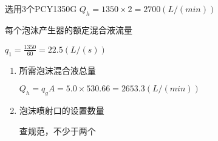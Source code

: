 \documentclass[fontset=windows]{article}
\newcommand{\upcite}[1]{\textsuperscript{\cite{#1}}}
\begin{document}
{选用3个PCY1350G  $Q_h = 1350 \times  2 = 2700 (  L / ( min) ) $}\par
每个泡沫产生器的额定混合液流量

{ $q_1 = \frac{1350}
    {60}
    =22.5 (  L / ( s) ) $}
    \begin{enumerate} %
        \item 所需泡沫混合液总量\par
        { $Q_h = q_gA = 5.0 \times 530.66 = 2653.3 (  L / ( min) ) $}\par
        \item 泡沫喷射口的设置数量\par
        查规范，不少于两个  \upcite{2}
    \end{enumerate}









\end{document}
